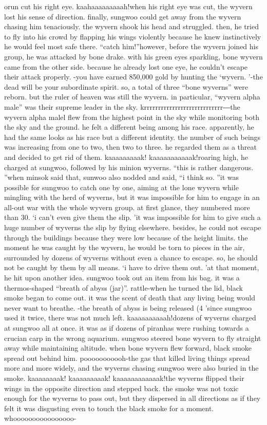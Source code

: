 orun cut his right eye.
kaahaaaaaaaaah!when his right eye was cut, the wyvern lost his sense of direction.
 finally, sungwoo could get away from the wyvern chasing him tenaciously.
the wyvern shook his head and struggled.
 then, he tried to fly into his crowd by flapping his wings violently because he knew instinctively he would feel most safe there.
“catch him!”however, before the wyvern joined his group, he was attacked by bone drake.
with his green eyes sparkling, bone wyvern came from the other side.
because he already lost one eye, he couldn’t escape their attack properly.
-you have earned 850,000 gold by hunting the ‘wyvern.
’-the dead will be your subordinate spirit.
so, a total of three “bone wyverns” were reborn.
but the ruler of heaven was still the wyvern.
 in particular, “wyvern alpha male” was their supreme leader in the sky.
krrrrrrrrrrrrrrrrrrrrrrrrrrrr―the wyvern alpha malel flew from the highest point in the sky while monitoring both the sky and the ground.
 he felt a different being among his race.
 apparently, he had the same looks as his race but a different identity.
 the number of such beings was increasing from one to two, then two to three.
he regarded them as a threat and decided to get rid of them.
kaaaaaaaaak! kaaaaaaaaaaak!roaring high, he charged at sungwoo, followed by his minion wyverns.
“this is rather dangerous.
”when minsok said that, sunwoo also nodded and said, “i think so.
”it was possible for sungwoo to catch one by one, aiming at the lone wyvern while mingling with the herd of wyverns, but it was impossible for him to engage in an all-out war with the whole wyvern group.
 at first glance, they numbered more than 30.
‘i can’t even give them the slip.
’it was impossible for him to give such a huge number of wyverns the slip by flying elsewhere.
besides, he could not escape through the buildings because they were low because of the height limits.
the moment he was caught by the wyvern, he would be torn to pieces in the air, surrounded by dozens of wyverns without even a chance to escape.
 so, he should not be caught by them by all means.
‘i have to drive them out.
’at that moment, he hit upon another idea.
sungwoo took out an item from his bag.
 it was a thermos-shaped “breath of abyss (jar)”.
rattle-when he turned the lid, black smoke began to come out.
 it was the scent of death that any living being would never want to breathe.
-the breath of abyss is being released (4%
’since sungwoo used it twice, there was not much left.
kaaaaaaaaaah!dozens of wyverns charged at sungwoo all at once.
 it was as if dozens of piranhas were rushing towards a crucian carp in the wrong aquarium.
sungwoo steered bone wyvern to fly straight away while maintaining altitude.
 when bone wyvern flew forward, black smoke spread out behind him.
pooooooooooh-the gas that killed living things spread more and more widely, and the wyverns chasing sungwoo were also buried in the smoke.
kaaaaaaaak! kaaaaaaaaak! kaaaaaaaaaaaak!the wyverns flipped their wings in the opposite direction and stepped back.
 the smoke was not toxic enough for the wyverns to pass out, but they dispersed in all directions as if they felt it was disgusting even to touch the black smoke for a moment.
whoooooooooooooooo-

